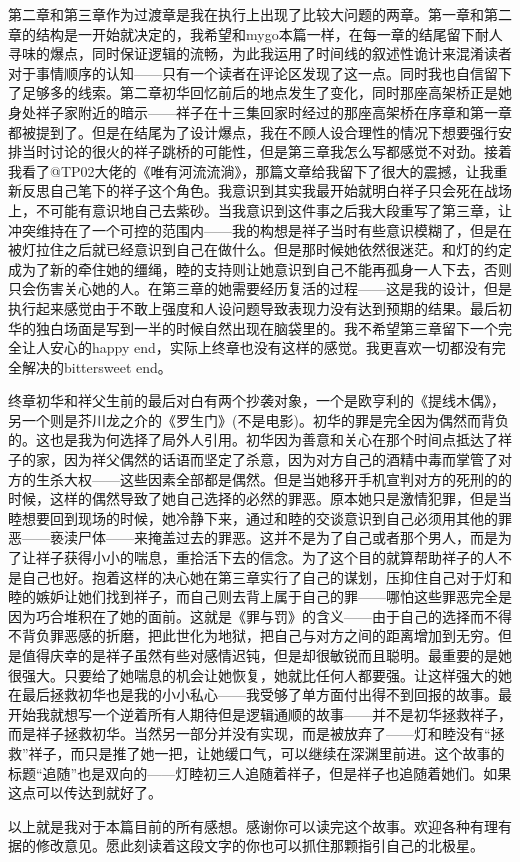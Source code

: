 \documentclass{article}
\begin{document}
第二章和第三章作为过渡章是我在执行上出现了比较大问题的两章。第一章和第二章的结构是一开始就决定的，我希望和mygo本篇一样，在每一章的结尾留下耐人寻味的爆点，同时保证逻辑的流畅，为此我运用了时间线的叙述性诡计来混淆读者对于事情顺序的认知——只有一个读者在评论区发现了这一点。同时我也自信留下了足够多的线索。第二章初华回忆前后的地点发生了变化，同时那座高架桥正是她身处祥子家附近的暗示——祥子在十三集回家时经过的那座高架桥在序章和第一章都被提到了。但是在结尾为了设计爆点，我在不顾人设合理性的情况下想要强行安排当时讨论的很火的祥子跳桥的可能性，但是第三章我怎么写都感觉不对劲。接着我看了@TP02大佬的《唯有河流流淌》，那篇文章给我留下了很大的震撼，让我重新反思自己笔下的祥子这个角色。我意识到其实我最开始就明白祥子只会死在战场上，不可能有意识地自己去紫砂。当我意识到这件事之后我大段重写了第三章，让冲突维持在了一个可控的范围内——我的构想是祥子当时有些意识模糊了，但是在被灯拉住之后就已经意识到自己在做什么。但是那时候她依然很迷茫。和灯的约定成为了新的牵住她的缰绳，睦的支持则让她意识到自己不能再孤身一人下去，否则只会伤害关心她的人。在第三章的她需要经历复活的过程——这是我的设计，但是执行起来感觉由于不敢上强度和人设问题导致表现力没有达到预期的结果。最后初华的独白场面是写到一半的时候自然出现在脑袋里的。我不希望第三章留下一个完全让人安心的happy end，实际上终章也没有这样的感觉。我更喜欢一切都没有完全解决的bittersweet end。



终章初华和祥父生前的最后对白有两个抄袭对象，一个是欧亨利的《提线木偶》，另一个则是芥川龙之介的《罗生门》(不是电影)。初华的罪是完全因为偶然而背负的。这也是我为何选择了局外人引用。初华因为善意和关心在那个时间点抵达了祥子的家，因为祥父偶然的话语而坚定了杀意，因为对方自己的酒精中毒而掌管了对方的生杀大权——这些因素全部都是偶然。但是当她移开手机宣判对方的死刑的的时候，这样的偶然导致了她自己选择的必然的罪恶。原本她只是激情犯罪，但是当睦想要回到现场的时候，她冷静下来，通过和睦的交谈意识到自己必须用其他的罪恶——亵渎尸体——来掩盖过去的罪恶。这并不是为了自己或者那个男人，而是为了让祥子获得小小的喘息，重拾活下去的信念。为了这个目的就算帮助祥子的人不是自己也好。抱着这样的决心她在第三章实行了自己的谋划，压抑住自己对于灯和睦的嫉妒让她们找到祥子，而自己则去背上属于自己的罪——哪怕这些罪恶完全是因为巧合堆积在了她的面前。这就是《罪与罚》的含义——由于自己的选择而不得不背负罪恶感的折磨，把此世化为地狱，把自己与对方之间的距离增加到无穷。但是值得庆幸的是祥子虽然有些对感情迟钝，但是却很敏锐而且聪明。最重要的是她很强大。只要给了她喘息的机会让她恢复，她就比任何人都要强。让这样强大的她在最后拯救初华也是我的小小私心——我受够了单方面付出得不到回报的故事。最开始我就想写一个逆着所有人期待但是逻辑通顺的故事——并不是初华拯救祥子，而是祥子拯救初华。当然另一部分并没有实现，而是被放弃了——灯和睦没有“拯救”祥子，而只是推了她一把，让她缓口气，可以继续在深渊里前进。这个故事的标题“追随”也是双向的——灯睦初三人追随着祥子，但是祥子也追随着她们。如果这点可以传达到就好了。



以上就是我对于本篇目前的所有感想。感谢你可以读完这个故事。欢迎各种有理有据的修改意见。愿此刻读着这段文字的你也可以抓住那颗指引自己的北极星。
\end{document}
